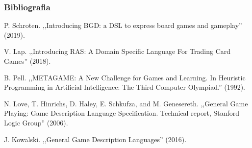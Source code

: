 \documentclass{beamer}
\begin{document}
\begin{frame}[allowframebreaks]
	\frametitle{Bibliografia}
	
	\begin{thebibliography}{9}
		 P. Schroten. ,,Introducing BGD: a DSL to express board games and gameplay'' (2019).

		 V. Lap. ,,Introducing RAS: A Domain Specific Language For Trading Card Games'' (2018).

		  B. Pell. ,,METAGAME: A New Challenge for Games and Learning. In Heuristic Programming in Artificial Intelligence: The Third Computer Olympiad.'' (1992).

		  N. Love, T. Hinrichs, D. Haley, E. Schkufza, and M. Genesereth. ,,General Game Playing: Game Description Language Specification. Technical report, Stanford Logic Group'' (2006).

		 J. Kowalski. ,,General Game Description Languages'' (2016).
	\end{thebibliography}
\end{frame}
\end{document}
